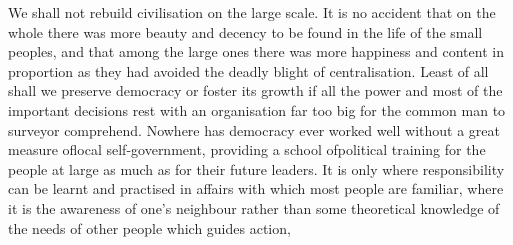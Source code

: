 \documentclass[11pt,openany]{book}
\begin{document}
\begin{center}\textasteriskcentered\hspace{0.9em}\textasteriskcentered\hspace{0.9em}\textasteriskcentered\end{center}

\begin{center}\textasteriskcentered\hspace{0.9em}\textasteriskcentered\hspace{0.9em}\textasteriskcentered\end{center}

\begin{center}\textasteriskcentered\hspace{0.9em}\textasteriskcentered\hspace{0.9em}\textasteriskcentered\end{center}

\begin{center}\textasteriskcentered\hspace{0.9em}\textasteriskcentered\hspace{0.9em}\textasteriskcentered\end{center}

\begin{center}\textasteriskcentered\hspace{0.9em}\textasteriskcentered\hspace{0.9em}\textasteriskcentered\end{center}

We shall not rebuild civilisation on the large scale. It is no accident that on the whole there was more beauty and decency to be found in the life of the small peoples, and that among the large ones there was more happiness and content in proportion as they had avoided the deadly blight of centralisation. Least of all shall we preserve democracy or foster its growth if all the power and most of the important decisions rest with an organisation far too big for the common man to surveyor comprehend. Nowhere has democracy ever worked well without a great measure oflocal self-government, providing a school ofpolitical training for the people at large as much as for their future leaders. It is only where responsibility can be learnt and practised in affairs with which most people are familiar, where it is the awareness of one's neighbour rather than some theoretical knowledge of the needs of other people which guides action,
\end{document}
